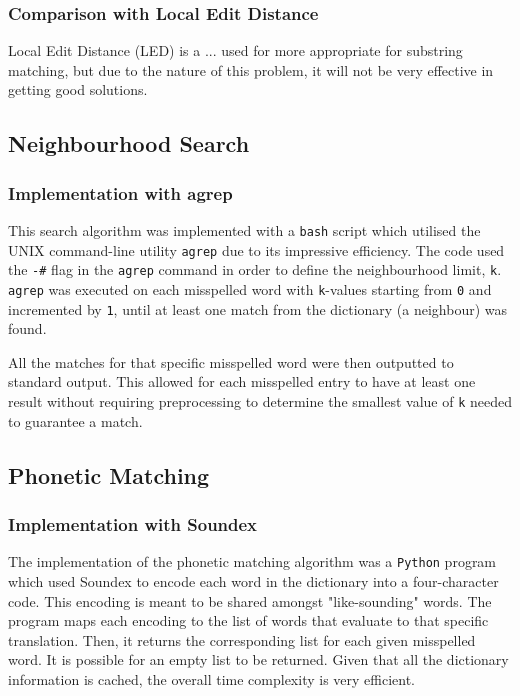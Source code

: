 \documentclass[11pt]{article}
\begin{document}
\subsubsection{Comparison with Local Edit Distance}
Local Edit Distance (LED) is a ... used for  more appropriate for substring matching, but due to the nature of this problem, it will not be very effective in getting good solutions.



\subsection{Neighbourhood Search}
\subsubsection{Implementation with agrep}
This search algorithm was implemented with a \texttt{bash} script which utilised the UNIX command-line utility \texttt{agrep}  %
 due to its impressive efficiency. The code used the \texttt{-\#} flag in the \texttt{agrep} command in order to define the neighbourhood limit, \texttt{k}. \texttt{agrep} was executed on each misspelled word with \texttt{k}-values starting from \texttt{0} and incremented by \texttt{1}, until at least one match from the dictionary (a neighbour) was found.

All the matches for that specific misspelled word were then outputted to standard output. This allowed for each misspelled entry to have at least one result without requiring preprocessing to determine the smallest value of \texttt{k} needed to guarantee a match.


\subsection{Phonetic Matching}


\subsubsection{Implementation with Soundex}
The implementation of the phonetic matching algorithm was a \texttt{Python} program which used Soundex
to encode each word in the dictionary into a four-character code. This encoding is meant to be shared amongst "like-sounding" words. %
The program maps each encoding to the list of words that evaluate to that specific translation. Then, it returns the corresponding list for each given misspelled word. It is possible for an empty list to be returned. Given that all the dictionary information is cached, the overall time complexity is very efficient.
\end{document}
